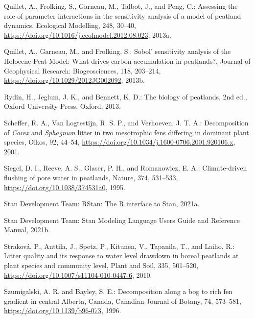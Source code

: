 \documentclass[
  12pt,
]{article}
\newlength{\cslhangindent}
\newlength{\cslentryspacingunit} %
\newenvironment{CSLReferences}[2] %
 {%
  \setlength{\parindent}{0pt}
  \ifodd #1
  \let\oldpar\par
  \def\par{\hangindent=\cslhangindent\oldpar}
  \fi
  \setlength{\parskip}{#2\cslentryspacingunit}
 }%
 {}
\begin{document}
\begin{CSLReferences}{0}{0}
\leavevmode{}%
Quillet, A., Frolking, S., Garneau, M., Talbot, J., and Peng, C.: Assessing the role of parameter interactions in the sensitivity analysis of a model of peatland dynamics, Ecological Modelling, 248, 30--40, \url{https://doi.org/10.1016/j.ecolmodel.2012.08.023}, 2013a.

\leavevmode{}%
Quillet, A., Garneau, M., and Frolking, S.: Sobol' sensitivity analysis of the {Holocene Peat Model}: {What} drives carbon accumulation in peatlands?, Journal of Geophysical Research: Biogeosciences, 118, 203--214, \url{https://doi.org/10.1029/2012JG002092}, 2013b.

\leavevmode{}%
Rydin, H., Jeglum, J. K., and Bennett, K. D.: The biology of peatlands, 2nd ed., Oxford University Press, Oxford, 2013.

\leavevmode{}%
Scheffer, R. A., Van Logtestijn, R. S. P., and Verhoeven, J. T. A.: Decomposition of {\emph{Carex}} and {\emph{Sphagnum}} litter in two mesotrophic fens differing in dominant plant species, Oikos, 92, 44--54, \url{https://doi.org/10.1034/j.1600-0706.2001.920106.x}, 2001.

\leavevmode{}%
Siegel, D. I., Reeve, A. S., Glaser, P. H., and Romanowicz, E. A.: Climate-driven flushing of pore water in peatlands, Nature, 374, 531--533, \url{https://doi.org/10.1038/374531a0}, 1995.

\leavevmode{}%
Stan Development Team: {RStan}: The {R} interface to {Stan}, 2021a.

\leavevmode{}%
Stan Development Team: Stan {Modeling Language Users Guide} and {Reference Manual}, 2021b.

\leavevmode{}%
Straková, P., Anttila, J., Spetz, P., Kitunen, V., Tapanila, T., and Laiho, R.: Litter quality and its response to water level drawdown in boreal peatlands at plant species and community level, Plant and Soil, 335, 501--520, \url{https://doi.org/10.1007/s11104-010-0447-6}, 2010.

\leavevmode{}%
Szumigalski, A. R. and Bayley, S. E.: Decomposition along a bog to rich fen gradient in central {Alberta}, {Canada}, Canadian Journal of Botany, 74, 573--581, \url{https://doi.org/10.1139/b96-073}, 1996.


\end{CSLReferences}
\end{document}

